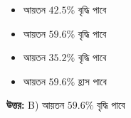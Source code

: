 \documentclass[12pt, a4paper]{article}
\begin{document}
\begin{itemize}[label={}, leftmargin=1cm, itemsep=0.5em]
    \item[\textbf{A)}] আয়তন $42.5\%$ বৃদ্ধি পাবে
    \item[\textbf{B)}] আয়তন $59.6\%$ বৃদ্ধি পাবে
    \item[\textbf{C)}] আয়তন $35.2\%$ বৃদ্ধি পাবে
    \item[\textbf{D)}] আয়তন $59.6\%$ হ্রাস পাবে
\end{itemize}

\vspace{0.5em}
\begin{tcolorbox}[answerbox]
    \textbf{\color{success} উত্তর:} B) আয়তন $59.6\%$ বৃদ্ধি পাবে
\end{tcolorbox}
\vspace{1em}
\end{document}
